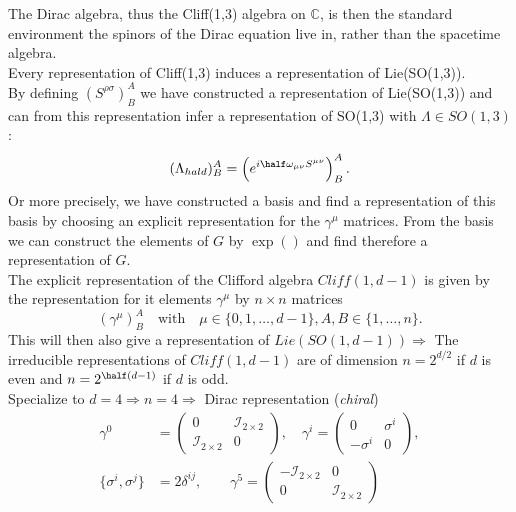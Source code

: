 The Dirac algebra, thus the Cliff(1,3) algebra on $\mathbb{C}$, is then the standard environment the spinors of the Dirac equation live in, rather than the spacetime algebra.\\
Every representation of Cliff(1,3) induces a representation of Lie(SO(1,3)).\\
By defining $(S^{\rho \sigma})^A_B$ we have constructed a representation of Lie(SO(1,3)) and can from this representation infer a representation of SO(1,3) with $\Lambda \in SO(1,3)$:
\begin{equation}
	(\Lambda_{hald})^A_B = \left(e^{i \half \omega_{\mu \nu} S^{\mu \nu}} \right)^A_B.
\end{equation}
Or more precisely, we have constructed a basis and find a representation of this basis by choosing an explicit representation for the $\gamma^{\mu}$ matrices. From the basis we can construct the elements of $G$ by $\exp()$ and find therefore a representation of $G$.\\
The explicit representation of the Clifford algebra $Cliff(1,d-1)$ is given by the representation for it elements $\gamma^{\mu}$ by $n\times n$ matrices 
\begin{equation}
	(\gamma^{\mu})^A_B \quad \mathrm{with} \quad \mu\in \{0,1, \dots, d-1\}, A,B\in\{1,\dots, n \}.
\end{equation}
This will then also give a representation of $Lie(SO(1,d-1)) \Rightarrow$ The irreducible representations of $Cliff(1,d-1)$ are of dimension    $n=2^{d/2}$ if $d$ is even and $n=2^{\half (d-1)}$ if $d$ is odd.\\
Specialize to $d=4 \Rightarrow n=4 \Rightarrow$ Dirac representation (\emph{chiral})
\begin{align}
	\gamma^0 &= \begin{pmatrix}
		0 & \mathcal{I}_{2\times 2} \\
		\mathcal{I}_{2 \times 2} & 0 
	\end{pmatrix},
\quad 
\gamma^i=
\begin{pmatrix}
	0 & \sigma^i \\-\sigma^i &0
\end{pmatrix},
\\
\{\sigma^i, \sigma^j\} &=2 \delta^{ij}, \qquad \gamma^5=
\begin{pmatrix}
	-\mathcal{I}_{2\times 2} &0 \\
	0& \mathcal{I}_{2 \times 2}
\end{pmatrix}
\end{align}

